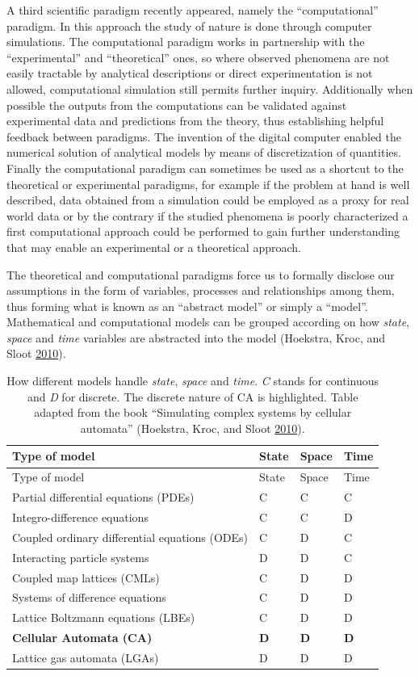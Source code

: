 \documentclass[
  openany]{book}
\begin{document}
A third scientific paradigm recently appeared, namely the ``computational'' paradigm. In this approach the study of nature is done through computer simulations. The computational paradigm works in partnership with the ``experimental'' and ``theoretical'' ones, so where observed phenomena are not easily tractable by analytical descriptions or direct experimentation is not allowed, computational simulation still permits further inquiry. Additionally when possible the outputs from the computations can be validated against experimental data and predictions from the theory, thus establishing helpful feedback between paradigms. The invention of the digital computer enabled the numerical solution of analytical models by means of discretization of quantities. Finally the computational paradigm can sometimes be used as a shortcut to the theoretical or experimental paradigms, for example if the problem at hand is well described, data obtained from a simulation could be employed as a proxy for real world data or by the contrary if the studied phenomena is poorly characterized a first computational approach could be performed to gain further understanding that may enable an experimental or a theoretical approach.

The theoretical and computational paradigms force us to formally disclose our assumptions in the form of variables, processes and relationships among them, thus forming what is known as an ``abstract model'' or simply a ``model''. Mathematical and computational models can be grouped according on how \emph{state}, \emph{space} and \emph{time} variables are abstracted into the model (Hoekstra, Kroc, and Sloot \protect\hyperlink{ref-hoekstra2010simulating}{2010}).

\begin{longtable}[]{@{}llll@{}}
\caption{\label{tab:models} How different models handle \emph{state}, \emph{space} and \emph{time}. \emph{C} stands for continuous and \emph{D} for discrete. The discrete nature of CA is highlighted.
Table adapted from the book ``Simulating complex systems by cellular automata'' (Hoekstra, Kroc, and Sloot \protect\hyperlink{ref-hoekstra2010simulating}{2010}).}\tabularnewline
\toprule
Type of model & State & Space & Time\tabularnewline
\midrule
\endfirsthead
\toprule
Type of model & State & Space & Time\tabularnewline
\midrule
\endhead
Partial differential equations (PDEs) & C & C & C\tabularnewline
Integro-difference equations & C & C & D\tabularnewline
Coupled ordinary differential equations (ODEs) & C & D & C\tabularnewline
Interacting particle systems & D & D & C\tabularnewline
Coupled map lattices (CMLs) & C & D & D\tabularnewline
Systems of difference equations & C & D & D\tabularnewline
Lattice Boltzmann equations (LBEs) & C & D & D\tabularnewline
\textbf{Cellular Automata (CA)} & \textbf{D} & \textbf{D} & \textbf{D}\tabularnewline
Lattice gas automata (LGAs) & D & D & D\tabularnewline
\bottomrule
\end{longtable}
\end{document}
